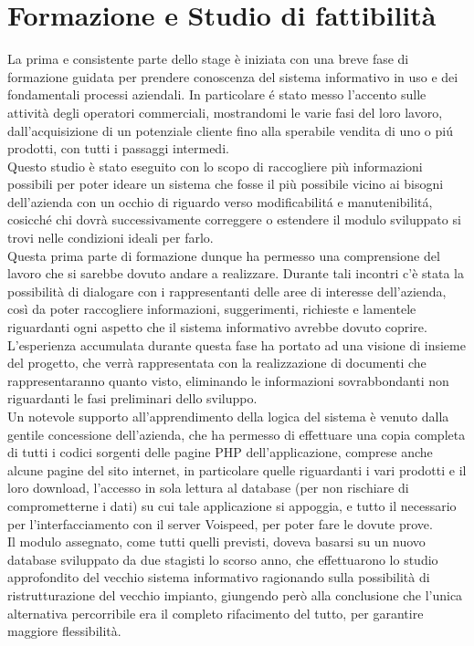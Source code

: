 \newpage
\section{Formazione e Studio di fattibilit\` a}
La prima e consistente parte dello stage \`e iniziata con una breve fase di formazione guidata per prendere conoscenza del sistema informativo in uso e dei fondamentali processi aziendali. In particolare \'e stato messo l'accento sulle attivit\`a degli operatori commerciali, mostrandomi le varie fasi del loro lavoro, dall'acquisizione di un potenziale cliente fino alla sperabile vendita di uno o pi\'u prodotti, con tutti i passaggi intermedi. \\
Questo studio \`e stato eseguito con lo scopo di raccogliere pi\`u informazioni possibili per poter ideare un sistema che fosse il pi\`u possibile vicino ai bisogni dell'azienda con un occhio di riguardo verso modificabilit\'a e manutenibilit\'a, cosicch\'e chi dovr\`a successivamente correggere o estendere il modulo sviluppato si trovi nelle condizioni ideali per farlo. \\
Questa prima parte di formazione dunque ha permesso una comprensione del lavoro che si sarebbe dovuto andare a realizzare. Durante tali incontri c'\`e stata la possibilit\`a di dialogare con i rappresentanti delle aree di interesse dell'azienda, cos\`i da poter raccogliere informazioni, suggerimenti, richieste e lamentele riguardanti ogni aspetto che il sistema informativo avrebbe dovuto coprire. \\
L'esperienza accumulata durante questa fase ha portato ad una visione di insieme del progetto, che verr\`a rappresentata con la realizzazione di documenti che rappresentaranno quanto visto, eliminando le informazioni sovrabbondanti non riguardanti le fasi preliminari dello sviluppo. \\
Un notevole supporto all'apprendimento della logica del sistema \`e venuto dalla gentile concessione dell'azienda, che ha permesso di effettuare una copia completa di tutti i codici sorgenti delle pagine PHP dell'applicazione, comprese anche alcune pagine del sito internet, in particolare quelle riguardanti i vari prodotti e il loro download, l'accesso in sola lettura al database (per non rischiare di comprometterne i dati) su cui tale applicazione si appoggia, e tutto il necessario per l'interfacciamento con il server Voispeed, per poter fare le dovute prove. \\
Il modulo assegnato, come tutti quelli previsti, doveva basarsi su un nuovo database sviluppato da due stagisti lo scorso anno, che effettuarono lo studio approfondito del vecchio sistema informativo ragionando sulla possibilit\`a di ristrutturazione del vecchio impianto, giungendo per\`o alla conclusione che l'unica alternativa percorribile era il completo rifacimento del tutto, per garantire maggiore flessibilit\`a. \\
